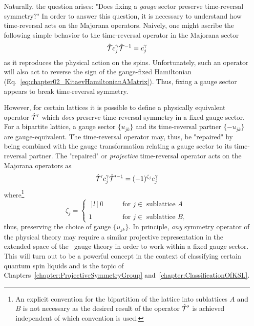 Naturally, the question arises: "Does fixing a \textit{gauge} sector preserve time-\linebreak reversal symmetry?"
In order to answer this question, it is necessary to understand how time-reversal acts on the Majorana operators.
Naively, one might ascribe the following simple behavior to the time-reversal operator in the Majorana sector
%
\begin{equation}
\hat{\mathcal{T}} c_j^{\gamma} \hat{\mathcal{T}}^{-1} = c_j^{\gamma}
\end{equation}
%
as it reproduces the physical action on the spins.
Unfortunately, such an operator will also act to reverse the sign of the gauge-fixed Hamiltonian (Eq.~\eqref{eq:chapter02_KitaevHamiltonianAMatrix}).
Thus, fixing a gauge sector appears to break time-reversal symmetry.

However, for certain lattices it is possible to define a physically equivalent operator $\hat{\mathcal{T}}^{\prime}$ which \textit{does} preserve time-reversal symmetry in a fixed gauge sector.
For a bipartite lattice, a gauge sector $\{u_{jk}\}$ and its time-reversal partner $\{-u_{jk}\}$ are gauge-equivalent.
The time-reversal operator may, thus, be "repaired" by being combined with the gauge transformation relating a gauge sector to its time-reversal partner.
The "repaired" or \textit{projective} time-reversal operator acts on the Majorana operators as
%
\begin{equation}
\hat{\mathcal{T}}^{\prime} c_j^{\gamma} \hat{\mathcal{T}}^{\prime-1} = (-1)^{\zeta_j} c_j^{\gamma}
\end{equation}
%
where\footnote{An explicit convention for the bipartition of the lattice into sublattices $A$ and $B$ is not necessary as the desired result of the operator $\hat{\mathcal{T}}^{\prime}$ is achieved independent of which convention is used.}
%
\begin{equation}
	\zeta_j = \left\{
		\begin{matrix*}[l]
			0 &
			\qquad \text{for $j \in$ sublattice $A$} \\
			&\\
			1 &
			\qquad \text{for $j \in$ sublattice $B$},
		\end{matrix*}
		\right.
\end{equation}
%
thus, preserving the choice of gauge $\{u_{jk}\}$.
In principle, \textit{any} symmetry operator of the physical theory may require a similar projective representation in the extended space of the \ZZ~gauge theory in order to work within a fixed gauge sector.
This will turn out to be a powerful concept in the context of classifying certain quantum spin liquids and is the topic of Chapters~\ref{chapter:ProjectiveSymmetryGroup} and~\ref{chapter:ClassificationOfKSL}.

